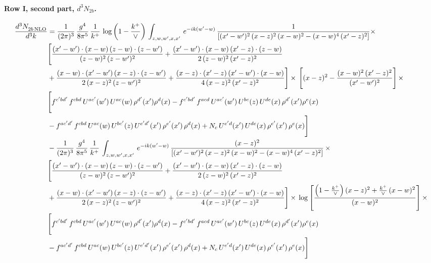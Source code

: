 \documentclass[10pt]{article}
\numberwithin{equation}{section}
\begin{document}
\paragraph{Row I, second part, $d^3N_{2b}$.}
\begin{align}
    \frac{d^{3}N_{2b\,\rm NLO}^{\rm}}{d^{3}k}  & =  \frac{1}{(2\pi)^{3}}\, \frac{g^{4}}{8\pi^{5}}\,\frac{1}{k^{+}}\,\log{\left(1-\frac{k^{+}}{\vee}\right)}\,\int_{z,w,w^{\prime},x,x'}\, e^{-ik(w^{\prime}-w)}\, \frac{1}{\left[(x'-w')^{2}\,(x-z)^{2}\,(x-w)^{2} - (x-w)^{4}\, (x'-z)^{2}\right]} \times\notag \\ & \Bigg[\frac{(x'-w')\cdot (x-w)\, (z-w)\cdot (z-w')}{(z-w)^{2}\, (z-w')^{2}}+\frac{(x'-w')\cdot (x-w)\, (x'-z)\cdot (z-w)}{2\, (z-w)^{2}\, (x'-z)^{2}}\notag \\ & +\frac{(x-w)\cdot (x'-w')\, (x-z)\cdot (z-w')}{2\, (x-z)^{2}\, (z-w')^{2}}+\frac{(x-z)\cdot (x'-z)\, (x'-w')\cdot (x-w)}{4\, (x-z)^{2}\, (x'-z)^{2}}\Bigg] \times\,\Bigg[(x-z)^{2} - \frac{(x-w)^{2}\, (x'-z)^{2}}{(x'-w')^{2}}\Bigg]\,\times \notag \\ & \Bigg[f^{c'bd'}\,f^{cbd}\, U^{ac'}(w')\,U^{ac}(w)\,\rho^{d'}(x')\rho^{d}(x)- f^{c'bd'}\,f^{acd}\,U^{ac'}(w')\,U^{bc}(z)\,U^{de}(x)\,\rho^{d'}(x')\rho^{e}(x) \notag \\ & -f^{ac'd'}\,f^{cbd}\,U^{ac}(w)\,U^{bc'}(z)\,U^{e'd'}(x')\,\rho^{e'}(x')\,\rho^{d}(x) +N_{c}\,U^{e'd}(x')\,U^{de}(x)\,\rho^{e'}(x')\,\rho^{e}(x)\Bigg] \notag \\
&  - \frac{1}{(2\pi)^{3}}\, \frac{g^{4}}{8\pi^{5}}\,\frac{1}{k^{+}}\,\int_{z,w,w^{\prime},x,x'}\, e^{-ik(w^{\prime}-w)}\, \frac{(x-z)^{2}}{\left[(x'-w')^{2}\,(x-z)^{2}\,(x-w)^{2} - (x-w)^{4}\, (x'-z)^{2}\right]}\,  \times\notag \\ & \Bigg[\frac{(x'-w')\cdot (x-w)\, (z-w)\cdot (z-w')}{(z-w)^{2}\, (z-w')^{2}}+\frac{(x'-w')\cdot (x-w)\, (x'-z)\cdot (z-w)}{2\, (z-w)^{2}\, (x'-z)^{2}}\notag \\ & +\frac{(x-w)\cdot (x'-w')\, (x-z)\cdot (z-w')}{2\, (x-z)^{2}\, (z-w')^{2}}+\frac{(x-z)\cdot (x'-z)\, (x'-w')\cdot (x-w)}{4\, (x-z)^{2}\, (x'-z)^{2}}\Bigg] \times\,\log{\left[\frac{\left(1-\frac{k^{+}}{\vee}\right)(x-z)^{2}+\frac{k^{+}}{\vee}\,(x-w)^{2}}{(x-w)^{2}}\right]}\,\times \notag \\ & \Bigg[f^{c'bd'}\,f^{cbd}\, U^{ac'}(w')\,U^{ac}(w)\,\rho^{d'}(x')\rho^{d}(x)- f^{c'bd'}\,f^{acd}\,U^{ac'}(w')\,U^{bc}(z)\,U^{de}(x)\,\rho^{d'}(x')\rho^{e}(x) \notag \\ & -f^{ac'd'}\,f^{cbd}\,U^{ac}(w)\,U^{bc'}(z)\,U^{e'd'}(x')\,\rho^{e'}(x')\,\rho^{d}(x) +N_{c}\,U^{e'd}(x')\,U^{de}(x)\,\rho^{e'}(x')\,\rho^{e}(x)\Bigg] \notag \\

\end{align}
\end{document}
